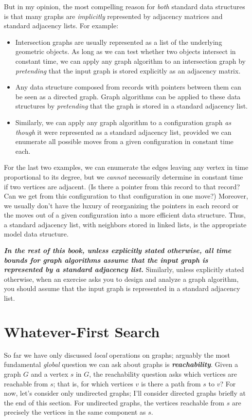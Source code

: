 But in my opinion, the most compelling reason for \textit{both} standard data structures is that many graphs are \textit{implicitly} represented by adjacency matrices and standard adjacency lists.
For example:
\begin{itemize}
\item Intersection graphs are usually represented as a list of the underlying geometric objects.
As long as we can test whether two objects intersect in constant time, we can apply any graph algorithm to an intersection graph by \textit{pretending} that the input graph is stored explicitly as an adjacency matrix.
\item Any data structure composed from records with pointers between them can be seen as a directed graph.
Graph algorithms can be applied to these data structures by \textit{pretending} that the graph is stored in a standard adjacency list.
\item Similarly, we can apply any graph algorithm to a configuration graph \textit{as though} it were represented as a standard adjacency list, provided we can enumerate all possible moves from a given configuration in constant time each.
\end{itemize}
For the last two examples, we can enumerate the edges leaving any vertex in time proportional to its degree, but we \textit{cannot} necessarily determine in constant time if two vertices are adjacent.
(Is there a pointer from this record to that record?
Can we get from this configuration to that configuration in one move?)
Moreover, we usually don’t have the luxury of reorganizing the pointers in each record or the moves out of a given configuration into a more efficient data structure.
Thus, a standard adjacency list, with neighbors stored in linked lists, is the appropriate model data structure.

\textbf{\textit{In the rest of this book, unless explicitly stated otherwise, all time bounds for graph algorithms assume that the input graph is represented by a standard adjacency list.}}
Similarly, unless explicitly stated otherwise, when an exercise asks you to design and analyze a graph algorithm, you should assume that the input graph is represented in a standard adjacency list.

\section{Whatever-First Search}
\label{sec:5.5}

So far we have only discussed \textit{local} operations on graphs; arguably the most fundamental \textit{global} question we can ask about graphs is \textbf{\textit{reachability}}.
Given a graph $G$ and a vertex $s$ in $G$, the reachability question asks which vertices are reachable from $s$; that is, for which vertices $v$ is there a path from $s$ to $v$?
For now, let’s consider only undirected graphs; I’ll consider directed graphs briefly at the end of this section.
For undirected graphs, the vertices reachable from $s$ are precisely the vertices in the same component as $s$.

